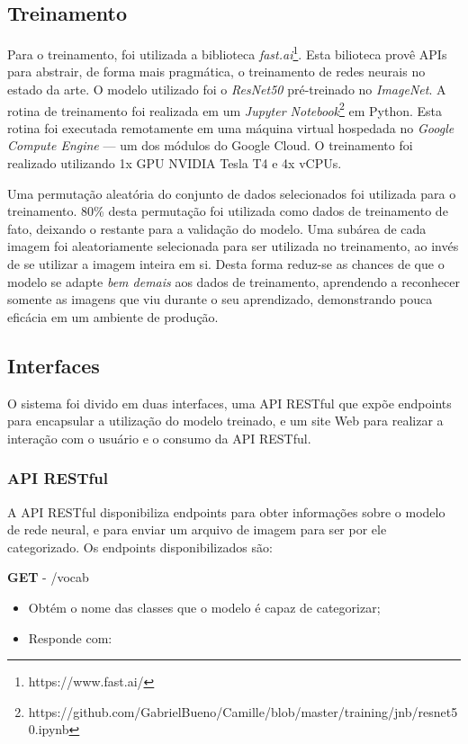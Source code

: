 \documentclass[12pt, a4paper]{article}
\begin{document}
\subsection{Treinamento}
Para o treinamento, foi utilizada a biblioteca \emph{fast.ai}\footnote{https://www.fast.ai/}. Esta bilioteca provê APIs para abstrair, de forma mais pragmática, o treinamento de redes neurais no estado da arte. O modelo utilizado foi o \emph{ResNet50} pré-treinado no \emph{ImageNet}. A rotina de treinamento foi realizada em um \emph{Jupyter Notebook}\footnote{https://github.com/GabrielBueno/Camille/blob/master/training/jnb/resnet50.ipynb} em Python. Esta rotina foi executada remotamente em uma máquina virtual hospedada no \emph{Google Compute Engine} --- um dos módulos do Google Cloud. O treinamento foi realizado utilizando 1x GPU NVIDIA Tesla T4 e 4x vCPUs.

Uma permutação aleatória do conjunto de dados selecionados foi utilizada para o treinamento. 80\% desta permutação foi utilizada como dados de treinamento de fato, deixando o restante para a validação do modelo. Uma subárea de cada imagem foi aleatoriamente selecionada para ser utilizada no treinamento, ao invés de se utilizar a imagem inteira em si. Desta forma reduz-se as chances de que o modelo se adapte \emph{bem demais} aos dados de treinamento, aprendendo a reconhecer somente as imagens que viu durante o seu aprendizado, demonstrando pouca eficácia em um ambiente de produção.

\subsection{Interfaces}
O sistema foi divido em duas interfaces, uma API RESTful que expõe endpoints para encapsular a utilização do modelo treinado, e um site Web para realizar a interação com o usuário e o consumo da API RESTful.

\subsubsection{API RESTful}
A API RESTful disponibiliza endpoints para obter informações sobre o modelo de rede neural, e para enviar um arquivo de imagem para ser por ele categorizado. Os endpoints disponibilizados são:

\newpage
\noindent
\textbf{GET} - /vocab

\begin{itemize}
\item Obtém o nome das classes que o modelo é capaz de categorizar;
\item Responde com:
\end{itemize}
\end{document}
